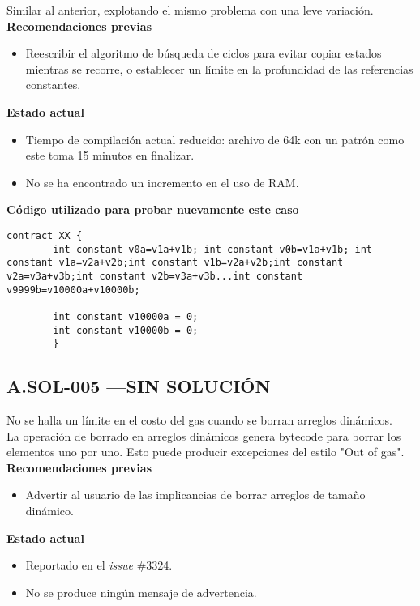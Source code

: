 Similar al anterior, explotando el mismo problema con una leve variación.\\


\textbf{Recomendaciones previas}
\begin{itemize}
    \item Reescribir el algoritmo de búsqueda de ciclos para evitar copiar estados mientras se recorre, o establecer un límite en la profundidad de las referencias constantes.
\end{itemize}
\bigskip

\textbf{Estado actual}
\begin{itemize}
    \item Tiempo de compilación actual reducido: archivo de 64k con un patrón como este toma 15 minutos en finalizar.
    \item No se ha encontrado un incremento en el uso de RAM.
\end{itemize}
\bigskip

\textbf{Código utilizado para probar nuevamente este caso}
\begin{lstlisting}[language=Solidity]
    contract XX {
        int constant v0a=v1a+v1b; int constant v0b=v1a+v1b; int constant v1a=v2a+v2b;int constant v1b=v2a+v2b;int constant v2a=v3a+v3b;int constant v2b=v3a+v3b...int constant v9999b=v10000a+v10000b;
         
        int constant v10000a = 0;
        int constant v10000b = 0;
        }        
\end{lstlisting}

\subsection*{A.SOL-005  \color{BrickRed}—SIN SOLUCIÓN}
No se halla un límite en el costo del gas cuando se borran arreglos dinámicos.\\

La operación de borrado en arreglos dinámicos genera bytecode para borrar los elementos uno por uno. Esto puede producir excepciones del estilo "Out of gas".\\

\textbf{Recomendaciones previas}
\begin{itemize}
    \item Advertir al usuario de las implicancias de borrar arreglos de tamaño dinámico.
\end{itemize}
\bigskip

\textbf{Estado actual}
\begin{itemize}
    \item Reportado en el \textit{issue} \#3324\cite{GHI3324}.
    \item No se produce ningún mensaje de advertencia.    
\end{itemize}
\bigskip


